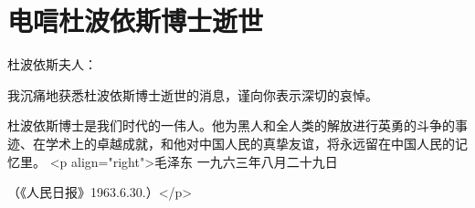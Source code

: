 \section[电唁杜波依斯博士逝世（一九六三年八月二十九日）]{电唁杜波依斯博士逝世}


杜波依斯夫人：

我沉痛地获悉杜波依斯博士逝世的消息，谨向你表示深切的哀悼。

杜波依斯博士是我们时代的一伟人。他为黑人和全人类的解放进行英勇的斗争的事迹、在学术上的卓越成就，和他对中国人民的真挚友谊，将永远留在中国人民的记忆里。
<p align="right">毛泽东
一九六三年八月二十九日

（《人民日报》1963.6.30.）</p>



